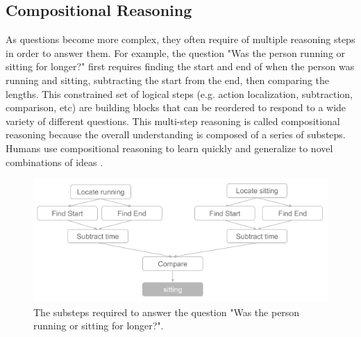 \documentclass[10pt,twocolumn,letterpaper]{article}
\newcommand{\mgm}[1]{{\color{cyan}{mgm: #1}}}
\begin{document}

\subsection{Compositional Reasoning}

As questions become more complex, they often require of multiple reasoning steps in order to answer them. For example, the question "Was the person running or sitting for longer?" first requires finding the start and end of when the person was running and sitting, subtracting the start from the end, then comparing the lengths. This constrained set of logical steps (e.g. action localization, subtraction, comparison, etc) are building blocks that can be reordered to respond to a wide variety of different questions. \mgm{Figure?} This multi-step reasoning is called compositional reasoning because the overall understanding is composed of a series of substeps. Humans use compositional reasoning to learn quickly and generalize to novel combinations of ideas \cite{tani2014self, lake2018generalization, schulz2016probing}. 


\begin{figure}[t]
\begin{center}
\includegraphics[width=0.8\linewidth]{figure_composition.png}
\end{center}
   \caption{The substeps required to answer the question "Was the person running or sitting for longer?".}
\label{fig:long}
\label{fig:onecol}
\end{figure}
\end{document}

